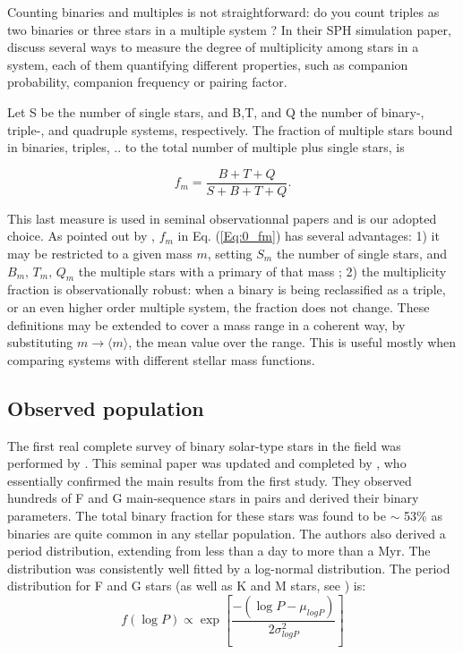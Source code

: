 Counting binaries and multiples is not straightforward: do you count triples as two binaries or three stars in a multiple system ? In their SPH simulation paper, \cite{Goodwin2004a} discuss several ways to measure the degree of multiplicity among stars in a system, each of them quantifying different properties, such as companion probability, companion frequency or pairing factor. 

Let  S be the number of single stars, and B,T, and Q the number of binary-, triple-, and quadruple systems, respectively. The fraction of multiple stars bound in binaries, triples, .. to the total number of multiple plus single stars, is

\begin{equation}
\label{Eq:0_fm} 
f_m = \frac{B + T + Q}{S + B + T + Q}. 
\end{equation}

This last  measure is used in seminal observationnal papers \citep{DM91,Raghavan2010} and is our adopted choice. As pointed out by \cite{Hubber2005}, $f_m$ in Eq. (\ref{Eq:0_fm}) has several advantages: 1) it  may be  restricted to a given mass $m$, setting  $S_m$ the number of single stars, and $B_m,\, T_m,\, Q_m$  the multiple stars with a primary of that mass ;  2)  the multiplicity fraction is observationally robust: when a binary is being reclassified as a triple, or an even higher order multiple system, the fraction does not change. 
 These definitions may be extended to cover a mass range  in a coherent way, by substituting $m \rightarrow \langle m\rangle$, the mean value over the range. This is useful mostly when comparing  systems with different stellar mass functions. 


\subsection{Observed population}

The first real complete survey of binary solar-type stars in the field was performed by \cite{DM91}. This seminal paper was updated and completed by \cite{Raghavan2010}, who essentially confirmed the main results from the first study. They observed hundreds of F and G main-sequence stars in pairs and derived their binary parameters. The total binary fraction for these stars was found to be $\sim$ 53\% as binaries are quite common in any stellar population.
  The authors also derived a period distribution, extending from less than a day to more than a Myr. The distribution was consistently well fitted by a log-normal distribution. The period distribution for F and G stars (as well as K and M stars, see \citealt{Fischer1992}) is:
\begin{equation}
f( \log{P})\propto \exp \left[ \frac{- ( \log{P} - \mu_{logP})}{ 2 \sigma_{logP}^2} \right]
\end{equation}

